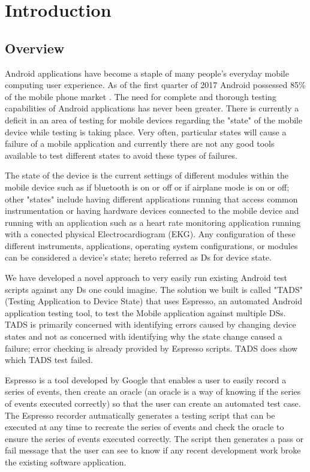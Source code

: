 \section{Introduction}
\subsection{Overview}
Android applications have become a staple of many people's everyday mobile computing user experience.  As of the first quarter of 2017 Android possessed 85\% of the mobile phone market \cite{boulos2014mobile}.  The need for complete and thorough testing capabilities of Android applications has never been greater. There is currently a deficit in an area of testing for mobile devices regarding the "state" of the mobile device while testing is taking place. Very often, particular states will cause a failure of a mobile application and currently there are not any good tools available to test different states to avoid these types of failures.

The state of the device is the current settings of different modules within the mobile device such as if bluetooth is on or off or if airplane mode is on or off; other "states" include having different applications running that access common instrumentation or having hardware devices connected to the mobile device and running with an application such as a heart rate monitoring application running with a conected physical Electrocardiogram (EKG).  Any configuration of these different instruments, applications, operating system configurations, or modules can be considered a device's state; hereto referred as Ds for device state.

We have developed a novel approach to very easily run existing Android test scripts against any Ds one could imagine.  The solution we built is called "TADS" (Testing Application to Device State) that uses Espresso, an automated Android application testing tool, to test the Mobile application against multiple DSs.  TADS is primarily concerned with identifying errors caused by changing device states and not as concerned with identifying why the state change caused a failure; error checking is already provided by Espresso scripts.  TADS does show which TADS test failed.

Espresso is a tool developed by Google that enables a user to easily record a series of events, then create an oracle (an oracle is a way of knowing if the series of events executed correctly) so that the user can create an automated test case.  The Espresso recorder autmatically generates a testing script that can be executed at any time to recreate the series of events and check the oracle to ensure the series of events executed correctly.  The script then generates a pass or fail message that the user can see to know if any recent development work broke the existing software application. 

